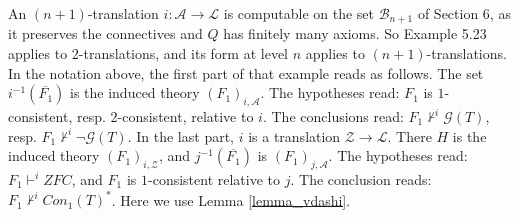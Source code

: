 \documentclass{amsart}  %
\numberwithin{equation}{section}
\theoremstyle{definition}
\theoremstyle{remark}
\begin{document}
An $(n+1)$-translation $i: \mathcal{A} \to \mathcal{L}$ is computable on the set $\mathcal{B} _{n+1}$ of Section 6, as it preserves the connectives and $Q$ has finitely many axioms. So Example 5.23 applies to $2$-translations, and its form at level $n$ applies to $(n+1)$-translations. In the notation above, the first part of that example reads as follows. The set $i ^{-1} (\overline{F _{1}})$ is the induced theory $(F _{1}) _{i, \mathcal{A}}$. The hypotheses read: $F _{1}$ is $1$-consistent, resp. $2$-consistent, relative to $i$. The conclusions read: $F _{1} \nvdash ^{i} \mathcal{G} (T)$, resp. $F _{1} \nvdash ^{i} \neg \mathcal{G} (T)$. In the last part, $i$ is a translation $\mathcal{Z} \to \mathcal{L}$. There $H$ is the induced theory $(F _{1}) _{i, \mathcal{Z}}$, and $j ^{-1} (\overline{F _{1}})$ is $(F _{1}) _{j, \mathcal{A}}$. The hypotheses read: $F _{1} \vdash ^{i} ZFC$, and $F _{1}$ is $1$-consistent relative to $j$. The conclusion reads: $F _{1} \nvdash ^{i} Con _{1} (T) ^{\ast}$. Here we use Lemma \ref{lemma_vdashi}.
\end{document}
